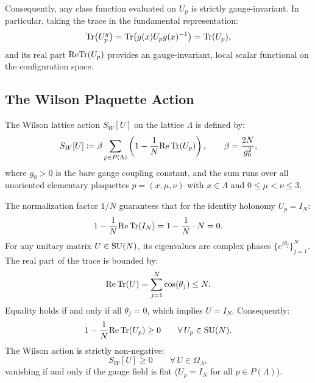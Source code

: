 Consequently, any class function evaluated on $U_p$ is strictly gauge-invariant. In particular, taking the trace in the fundamental representation:
\begin{equation}
\mathrm{Tr}\bigl( U_p^g \bigr) = \mathrm{Tr}\bigl( g(x) U_p g(x)^{-1} \bigr) = \mathrm{Tr}(U_p),
\end{equation}
and its real part $\mathrm{Re} \mathrm{Tr}(U_p)$ provides an gauge-invariant, local scalar functional on the configuration space.

\subsection{The Wilson Plaquette Action}
\label{subsec:wilson_action_def}
\begin{definition}
The Wilson lattice action $S_W[U]$ on the lattice $\Lambda$ is defined by:
\begin{equation}
\label{eq:wilson_lattice_action}
S_W[U] \coloneqq \beta \sum_{p \in P(\Lambda)} \left( 1 - \frac{1}{N} \mathrm{Re} \, \mathrm{Tr}(U_p) \right), \qquad \beta = \frac{2N}{g_0^2},
\end{equation}
where $g_0 > 0$ is the bare gauge coupling constant, and the sum runs over all unoriented elementary plaquettes $p = (x, \mu, \nu)$ with $x \in \Lambda$ and $0 \le \mu < \nu \le 3$.
\end{definition}

The normalization factor $1/N$ guarantees that for the identity holonomy $U_p = I_N$:
\begin{equation}
1 - \frac{1}{N} \mathrm{Re} \, \mathrm{Tr}(I_N) = 1 - \frac{1}{N} \cdot N = 0.
\end{equation}
For any unitary matrix $U \in \mathrm{SU}(N)$, its eigenvalues are complex phases $\{e^{i\theta_j}\}_{j=1}^N$. The real part of the trace is bounded by:
\begin{equation}
\mathrm{Re} \, \mathrm{Tr}(U) = \sum_{j=1}^N \cos(\theta_j) \le N.
\end{equation}
Equality holds if and only if all $\theta_j = 0$, which implies $U = I_N$. Consequently:
\begin{equation}
1 - \frac{1}{N} \mathrm{Re} \, \mathrm{Tr}(U_p) \ge 0 \qquad \forall \, U_p \in \mathrm{SU}(N).
\end{equation}
The Wilson action is strictly non-negative:
\begin{equation}
S_W[U] \ge 0 \qquad \forall \, U \in \Omega_\Lambda,
\end{equation}
vanishing if and only if the gauge field is flat ($U_p = I_N$ for all $p \in P(\Lambda)$).

